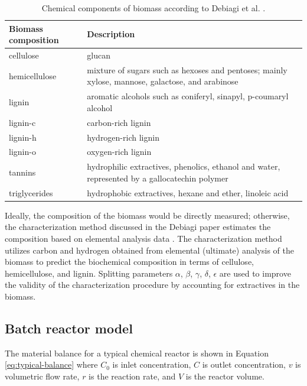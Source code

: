 \begin{table}[H]
    \centering
    \caption{Chemical components of biomass according to Debiagi et al. \cite{Debiagi-2015}.}
    \label{tab:chem-components}
    \begin{tabular}{lp{2.2in}}
        \toprule
        Biomass composition & Description \\
        \midrule
        cellulose     & glucan \\
        \addlinespace[0.1in]
        hemicellulose & mixture of sugars such as hexoses and pentoses; mainly xylose, mannose, galactose, and arabinose \\
        \addlinespace[0.1in]
        lignin        & aromatic alcohols such as coniferyl, sinapyl, p-coumaryl alcohol \\
        \addlinespace[0.1in]
        lignin-c      & carbon-rich lignin \\
        \addlinespace[0.1in]
        lignin-h      & hydrogen-rich lignin \\
        \addlinespace[0.1in]
        lignin-o      & oxygen-rich lignin \\
        \addlinespace[0.1in]
        tannins       & hydrophilic extractives, phenolics, ethanol and water, represented by a gallocatechin polymer \\
        \addlinespace[0.1in]
        triglycerides & hydrophobic extractives, hexane and ether, linoleic acid \\
        \bottomrule
    \end{tabular}
\end{table}

Ideally, the composition of the biomass would be directly measured; otherwise, the characterization method discussed in the Debiagi paper estimates the composition based on elemental analysis data \cite{Debiagi-2015}. The characterization method utilizes carbon and hydrogen obtained from elemental (ultimate) analysis of the biomass to predict the biochemical composition in terms of cellulose, hemicellulose, and lignin. Splitting parameters $\alpha$, $\beta$, $\gamma$, $\delta$, $\epsilon$ are used to improve the validity of the characterization procedure by accounting for extractives in the biomass.

\subsection{Batch reactor model}

The material balance for a typical chemical reactor is shown in Equation \ref{eq:typical-balance} where $C_0$ is inlet concentration, $C$ is outlet concentration, $v$ is volumetric flow rate, $r$ is the reaction rate, and $V$ is the reactor volume.

